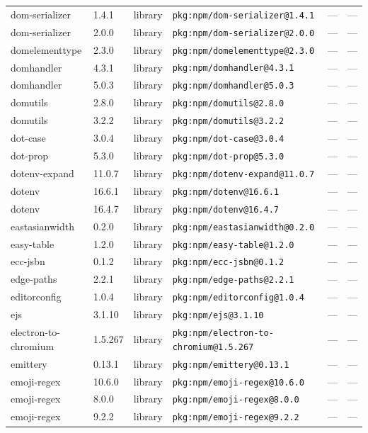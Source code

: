 \documentclass[11pt]{article}
\begin{document}
\begin{longtable}{|l|l|l|p{2.2cm}|l|p{4cm}|}
dom-serializer & 1.4.1 & library & \texttt{pkg:npm/dom-serializer@1.4.1} & — & — \\
dom-serializer & 2.0.0 & library & \texttt{pkg:npm/dom-serializer@2.0.0} & — & — \\
domelementtype & 2.3.0 & library & \texttt{pkg:npm/domelementtype@2.3.0} & — & — \\
domhandler & 4.3.1 & library & \texttt{pkg:npm/domhandler@4.3.1} & — & — \\
domhandler & 5.0.3 & library & \texttt{pkg:npm/domhandler@5.0.3} & — & — \\
domutils & 2.8.0 & library & \texttt{pkg:npm/domutils@2.8.0} & — & — \\
domutils & 3.2.2 & library & \texttt{pkg:npm/domutils@3.2.2} & — & — \\
dot-case & 3.0.4 & library & \texttt{pkg:npm/dot-case@3.0.4} & — & — \\
dot-prop & 5.3.0 & library & \texttt{pkg:npm/dot-prop@5.3.0} & — & — \\
dotenv-expand & 11.0.7 & library & \texttt{pkg:npm/dotenv-expand@11.0.7} & — & — \\
dotenv & 16.6.1 & library & \texttt{pkg:npm/dotenv@16.6.1} & — & — \\
dotenv & 16.4.7 & library & \texttt{pkg:npm/dotenv@16.4.7} & — & — \\
eastasianwidth & 0.2.0 & library & \texttt{pkg:npm/eastasianwidth@0.2.0} & — & — \\
easy-table & 1.2.0 & library & \texttt{pkg:npm/easy-table@1.2.0} & — & — \\
ecc-jsbn & 0.1.2 & library & \texttt{pkg:npm/ecc-jsbn@0.1.2} & — & — \\
edge-paths & 2.2.1 & library & \texttt{pkg:npm/edge-paths@2.2.1} & — & — \\
editorconfig & 1.0.4 & library & \texttt{pkg:npm/editorconfig@1.0.4} & — & — \\
ejs & 3.1.10 & library & \texttt{pkg:npm/ejs@3.1.10} & — & — \\
electron-to-chromium & 1.5.267 & library & \texttt{pkg:npm/electron-to-chromium@1.5.267} & — & — \\
emittery & 0.13.1 & library & \texttt{pkg:npm/emittery@0.13.1} & — & — \\
emoji-regex & 10.6.0 & library & \texttt{pkg:npm/emoji-regex@10.6.0} & — & — \\
emoji-regex & 8.0.0 & library & \texttt{pkg:npm/emoji-regex@8.0.0} & — & — \\
emoji-regex & 9.2.2 & library & \texttt{pkg:npm/emoji-regex@9.2.2} & — & — \\

\end{longtable}
\end{document}
